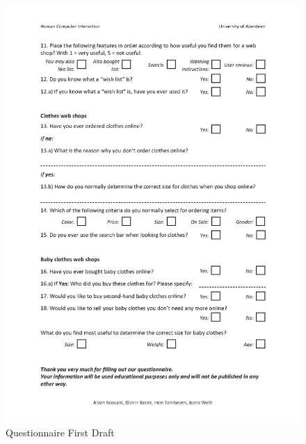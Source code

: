 \begin{figure}[h!]
\begin{center}
\includegraphics[scale=0.75]{User_Involvement_Methods/Questionnaires/Questionnaire_Web_Shops_v2_2.png}
\caption{Questionnaire First Draft}
\label{fig:draft}
\end{center}
\end{figure}
\newpage

